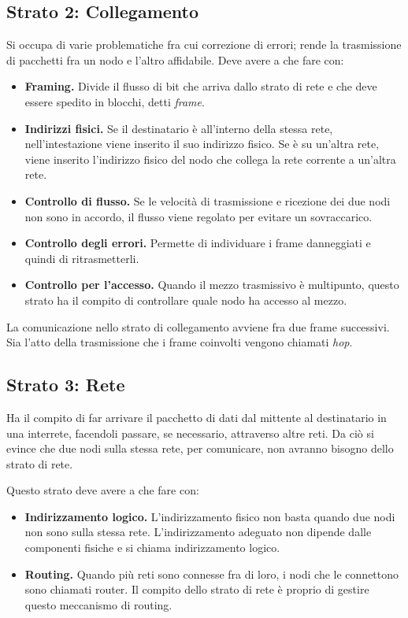     \subsection{Strato 2: Collegamento}
        Si occupa di varie problematiche fra cui correzione di errori; rende la trasmissione di pacchetti fra un nodo e l'altro affidabile. Deve avere a che fare con:
        \begin{itemize}
            \item \textbf{Framing.} Divide il flusso di bit che arriva dallo strato di rete e che deve essere spedito in blocchi, detti \textit{frame}.
            
            \item \textbf{Indirizzi fisici.} Se il destinatario è all'interno della stessa rete, nell'intestazione viene inserito il suo indirizzo fisico. Se è su un'altra rete, viene inserito l'indirizzo fisico del nodo che collega la rete corrente a un'altra rete.
            
            \item \textbf{Controllo di flusso.} Se le velocità di trasmissione e ricezione dei due nodi non sono in accordo, il flusso viene regolato per evitare un sovraccarico.
            
            \item \textbf{Controllo degli errori.} Permette di individuare i frame danneggiati e quindi di ritrasmetterli.
            
            \item \textbf{Controllo per l'accesso.} Quando il mezzo trasmissivo è multipunto, questo strato ha il compito di controllare quale nodo ha accesso al mezzo.
        \end{itemize}
        
        La comunicazione nello strato di collegamento avviene fra due frame successivi. Sia l'atto della trasmissione che i frame coinvolti vengono chiamati \textit{hop}.
        
    \subsection{Strato 3: Rete}
        Ha il compito di far arrivare il pacchetto di dati dal mittente al destinatario in una interrete, facendoli passare, se necessario, attraverso altre reti. Da ciò si evince che due nodi sulla stessa rete, per comunicare, non avranno bisogno dello strato di rete.
        
        Questo strato deve avere a che fare con:
        \begin{itemize}
            \item \textbf{Indirizzamento logico.} L'indirizzamento fisico non basta quando due nodi non sono sulla stessa rete. L'indirizzamento adeguato non dipende dalle componenti fisiche e si chiama indirizzamento logico.
            
            \item \textbf{Routing.} Quando più reti sono connesse fra di loro, i nodi che le connettono sono chiamati router. Il compito dello strato di rete è proprio di gestire questo meccanismo di routing.
        \end{itemize}
        
